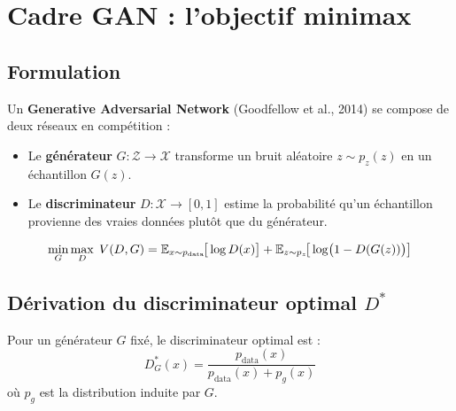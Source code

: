 \section{Cadre GAN : l'objectif minimax}
\label{sec:gan-framework}

\subsection{Formulation}

Un \textbf{Generative Adversarial Network} (Goodfellow et al., 2014) se compose de deux r\'eseaux en comp\'etition :
\begin{itemize}
    \item Le \textbf{g\'en\'erateur} $G : \mathcal{Z} \to \mathcal{X}$ transforme un bruit al\'eatoire $z \sim p_z(z)$ en un \'echantillon $G(z)$.
    \item Le \textbf{discriminateur} $D : \mathcal{X} \to [0, 1]$ estime la probabilit\'e qu'un \'echantillon provienne des vraies donn\'ees plut\^ot que du g\'en\'erateur.
\end{itemize}

\begin{mathbox}[title=\textbf{Objectif minimax des GAN}]
\begin{equation}
\min_G \max_D \; V(D, G) = \mathbb{E}_{x \sim p_{\text{data}}}\!\big[\log D(x)\big] + \mathbb{E}_{z \sim p_z}\!\big[\log\!\big(1 - D(G(z))\big)\big]
\label{eq:gan-minimax}
\end{equation}
\end{mathbox}

\subsection{D\'erivation du discriminateur optimal $D^*$}

\begin{theoreme}
\label{thm:optimal-D}
Pour un g\'en\'erateur $G$ fix\'e, le discriminateur optimal est :
\begin{equation}
D^*_G(x) = \frac{p_{\text{data}}(x)}{p_{\text{data}}(x) + p_g(x)}
\label{eq:optimal-D}
\end{equation}
o\`u $p_g$ est la distribution induite par $G$.
\end{theoreme}

